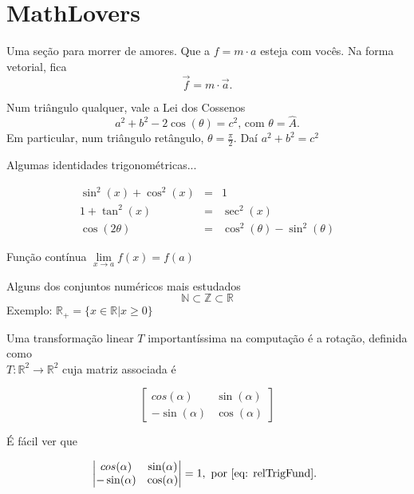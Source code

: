 \documentclass[10pt,a4paper,twocolumn]{book}
\begin{document}
		\section{MathLovers} 
			Uma seção para morrer de amores.
			Que a $f = m \cdot a $ esteja com vocês.
			Na forma vetorial, fica $$\vec{f} = m \cdot \vec{a}.$$
			
			Num triângulo qualquer, vale a Lei dos Cossenos
			\begin{equation}
				a^2 + b^2 - 2\cos(\theta) = c^2\mbox{, com } \theta = \hat{A}.
				\label{eq:leiCos}
			\end{equation}
			Em particular, num triângulo retângulo, $\theta = \frac{\pi}{2}$.
			Daí
			\begin{math}
				 a^2 + b^2 = c^2
			\end{math}
			
			Algumas identidades trigonométricas...
			
			\begin{eqnarray}
				\sin^2(x) + \cos^2(x) &= &1 \label{eq: relTrigFund}\\ 
				1 + \tan^2(x) &= &\sec^2(x) \\ \nonumber
				\cos(2\theta) &= &\cos^2(\theta) - \sin^2(\theta)
			\end{eqnarray}
		
			Função contínua
			\begin{math}
				\lim\limits_{x \rightarrow a} f(x) = f(a)
			\end{math}
			
			Alguns dos conjuntos numéricos mais estudados
			$$ \mathbb{N} \subset \mathbb{Z} \subset \mathbb{R}$$
			Exemplo: $ \mathbb{R}_+ = \{ x \in \mathbb{R} | x \ge 0\}$
			
			Uma transformação linear $T$ importantíssima na computação é a rotação, definida como  \\$T:\mathbb{R}^2 \longrightarrow \mathbb{R}^2$ cuja matriz associada é 
			
			\begin{equation}
				\begin{bmatrix}
					cos(\alpha) &\sin(\alpha) \\
					-\sin(\alpha) &\cos(\alpha)
				\end{bmatrix}
			\end{equation}
			
			É fácil ver que 
			
			\begin{equation}
				\begin{vmatrix}
					cos(\alpha) &\sin(\alpha) \\
					-\sin(\alpha) &\cos(\alpha)
				\end{vmatrix}
				= 1, \text{ por \ref{eq: relTrigFund}. }
			\end{equation}
			
\end{document}
